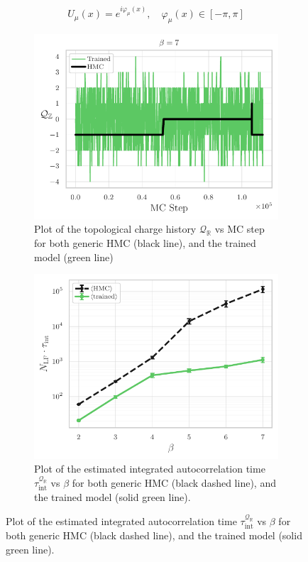 \documentclass{article} %
\begin{document}
\begin{equation}
   U_{\mu}(x) = e^{i\varphi_{\mu}(x)}, \quad \varphi_{\mu}(x) \in \left[-\pi, \pi\right]
\end{equation}
%
\begin{figure}[htpb]
   \centering
   \begin{subfigure}{0.48\textwidth}
      \includegraphics[width=\textwidth]{figures/topological_freezing_green.pdf}
      \caption{\label{fig:topological_freezing}Plot of the topological charge history \(\mathcal{Q}_{\mathbb{R}}\) vs MC
      step for both generic HMC (black line), and the trained model (green line)}
   \end{subfigure}
   \hfill
   \begin{subfigure}{0.48\textwidth}
      \includegraphics[width=\textwidth]{figures/autocorr_vs_beta.pdf}
      \caption{\label{fig:autocorr_vs_beta}Plot of the estimated integrated autocorrelation time \(\tau_{\mathrm{int}}^{\mathcal{Q}_{\mathbb{R}}}\)
      vs \(\beta\) for both generic HMC (black dashed line), and the trained model (solid green line).}
   \end{subfigure}
\end{figure}
%
\end{document}

